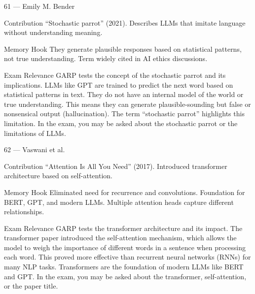 \documentclass[aspectratio=169,8pt]{beamer}
\begin{document}
	\begin{frame}{61 --- Emily M. Bender}
		\begin{block}{Contribution}
			``Stochastic parrot'' (2021). Describes LLMs that imitate language without understanding meaning.
		\end{block}
		\begin{block}{Memory Hook}
			They generate plausible responses based on statistical patterns, not true understanding. Term widely cited in AI ethics discussions.
		\end{block}
		\begin{block}{Exam Relevance}
			GARP tests the concept of the stochastic parrot and its implications. LLMs like GPT are trained to predict the next word based on statistical patterns in text. They do not have an internal model of the world or true understanding. This means they can generate plausible-sounding but false or nonsensical output (hallucination). The term ``stochastic parrot'' highlights this limitation. In the exam, you may be asked about the stochastic parrot or the limitations of LLMs.
		\end{block}
	\end{frame}
	
	\begin{frame}{62 --- Vaswani et al.}
		\begin{block}{Contribution}
			``Attention Is All You Need'' (2017). Introduced transformer architecture based on self-attention.
		\end{block}
		\begin{block}{Memory Hook}
			Eliminated need for recurrence and convolutions. Foundation for BERT, GPT, and modern LLMs. Multiple attention heads capture different relationships.
		\end{block}
		\begin{block}{Exam Relevance}
			GARP tests the transformer architecture and its impact. The transformer paper introduced the self-attention mechanism, which allows the model to weigh the importance of different words in a sentence when processing each word. This proved more effective than recurrent neural networks (RNNs) for many NLP tasks. Transformers are the foundation of modern LLMs like BERT and GPT. In the exam, you may be asked about the transformer, self-attention, or the paper title.
		\end{block}
	\end{frame}
	
\end{document}
